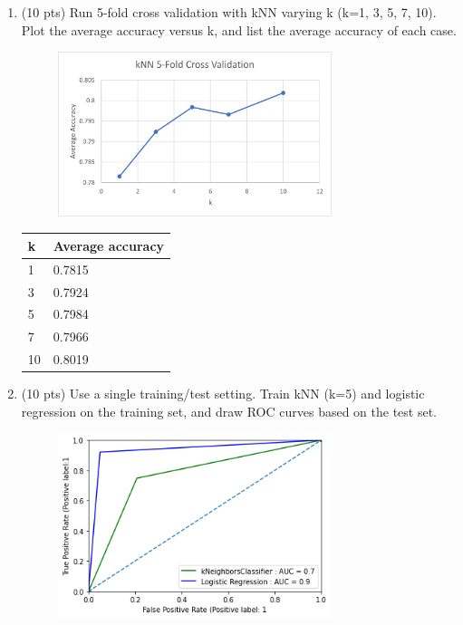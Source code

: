 \documentclass[a4paper]{article}
\theoremstyle{definition}
\newenvironment{soln}{
    \leavevmode\color{blue}\ignorespaces
}{}
\begin{document}
\begin{enumerate}
	\item (10 pts) Run 5-fold cross validation with kNN varying k (k=1, 3, 5, 7, 10). Plot the average accuracy versus k, and list the average accuracy of each case. \\

	\begin{figure}[H]
		\centering
		\includegraphics[width=8cm]{avg.png}
	\end{figure}
	
	\begin{soln}  \begin{table}[H]
\centering
\begin{tabular}{|l|l|}
\hline
\textbf{k} & \textbf{Average accuracy}      \\ \hline
1          & 0.7815                         \\ \hline
3          & 0.7924 \\ \hline
5          & 0.7984                         \\ \hline
7          & 0.7966                         \\ \hline
10         & 0.8019                         \\ \hline
\end{tabular}
\end{table} \end{soln}

\vspace{150}

	\item (10 pts) Use a single training/test setting. Train kNN (k=5) and logistic regression on the training set, and draw ROC curves based on the test set. \\
	\begin{figure}[h]
		\centering
		\includegraphics[width=8cm]{auc.png}
	\end{figure}
	
	
\end{enumerate}

\end{document}
